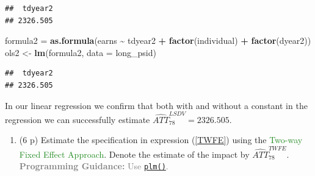 \documentclass[
]{article}
\newenvironment{Shaded}{\begin{snugshade}}{\end{snugshade}}
\newcommand{\AttributeTok}[1]{\textcolor[rgb]{0.13,0.29,0.53}{#1}}
\newcommand{\FunctionTok}[1]{\textcolor[rgb]{0.13,0.29,0.53}{\textbf{#1}}}
\newcommand{\NormalTok}[1]{#1}
\newcommand{\OtherTok}[1]{\textcolor[rgb]{0.56,0.35,0.01}{#1}}
\newcommand{\SpecialCharTok}[1]{\textcolor[rgb]{0.81,0.36,0.00}{\textbf{#1}}}
\newcommand{\StringTok}[1]{\textcolor[rgb]{0.31,0.60,0.02}{#1}}
\providecommand{\tightlist}{%
  \setlength{\itemsep}{0pt}\setlength{\parskip}{0pt}}
\begin{document}
\begin{Shaded}
\end{Shaded}

\begin{verbatim}
##  tdyear2 
## 2326.505
\end{verbatim}

\begin{Shaded}
\begin{Highlighting}[]
\NormalTok{formula2 }\OtherTok{=} \FunctionTok{as.formula}\NormalTok{(earns }\SpecialCharTok{\textasciitilde{}}\NormalTok{ tdyear2 }\SpecialCharTok{+} \FunctionTok{factor}\NormalTok{(individual) }\SpecialCharTok{+} \FunctionTok{factor}\NormalTok{(dyear2))}
\NormalTok{ols2 }\OtherTok{\textless{}{-}} \FunctionTok{lm}\NormalTok{(formula2, }\AttributeTok{data =}\NormalTok{ long\_psid)}
\end{Highlighting}
\end{Shaded}

\begin{Shaded}
\end{Shaded}

\begin{verbatim}
##  tdyear2 
## 2326.505
\end{verbatim}

In our linear regression we confirm that both with and without a
constant in the regression we can successfully estimate
\(\widehat{ATT}_{78}^{LSDV} = 2326.505\).

\begin{enumerate}
\def\labelenumi{\arabic{enumi}.}
\setcounter{enumi}{3}
\tightlist
\item
  (6 p) Estimate the specification in expression (\ref{TWFE}) using the
  \textcolor{ForestGreen}{Two-way Fixed Effect Approach}. Denote the
  estimate of the impact by \(\widehat{ATT}_{78}^{TWFE}\).
  \textcolor{Gray}{\textbf{Programming Guidance:} Use \href{https://www.rdocumentation.org/packages/plm/versions/2.6-3/topics/plm}{\texttt{plm()}}.}\label{item:twfe}
\end{enumerate}
\end{document}
